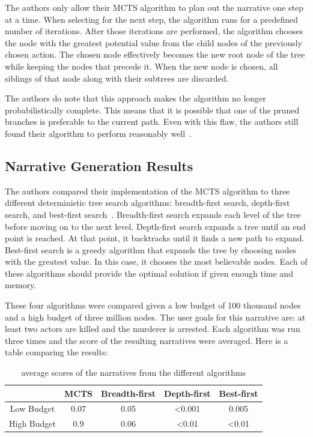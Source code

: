 \documentclass{sig-alternate}
\begin{document}
The authors only allow their MCTS algorithm to plan out the narrative one step at a time. When selecting for the next step, the algorithm runs for a predefined number of iterations. After those iterations are performed, the algorithm chooses the node with the greatest potential value from the child nodes of the previously chosen action. The chosen node effectively becomes the new root node of the tree while keeping the nodes that precede it. When the new node is chosen, all siblings of that node along with their subtrees are discarded.

The authors do note that this approach makes the algorithm no longer probabilistically complete. This means that it is possible that one of the pruned branches is preferable to the current path. Even with this flaw, the authors still found their algorithm to perform reasonably well~\cite{Narrative}.

\subsection{Narrative Generation Results}
The authors compared their implementation of the MCTS algorithm to three different deterministic tree search algorithms: breadth-first search, depth-first search, and best-first search~\cite{Narrative}. Breadth-first search expands each level of the tree before moving on to the next level. Depth-first search expands a tree until an end point is reached. At that point, it backtracks until it finds a new path to expand. Best-first search is a greedy algorithm that expands the tree by choosing nodes with the greatest value. In this case, it chooses the most believable nodes. Each of these algorithms should provide the optimal solution if given enough time and memory.

These four algorithms were compared given a low budget of 100 thousand nodes and a high budget of three million nodes. The user goals for this narrative are: at least two actors are killed and the murderer is arrested. Each algorithm was run three times and the score of the resulting narratives were averaged. Here is a table comparing the results: 

\begin{table}[h]
\centering
	\begin{tabular}{ c | c | c | c | c |}
	\cline{2-5}	 
	 & MCTS & Breadth-first & Depth-first & Best-first \\ \hline
	\multicolumn{1}{|p{1.05cm}|}{Low Budget} & 0.07 & 0.05 & <0.001 & 0.005 \\ \hline
	\multicolumn{1}{|p{1.05cm}|}{High Budget} & 0.9 & 0.06 & <0.01 & <0.01 \\ \hline
	\end{tabular}
	\caption[Table caption text]{average scores of the narratives from the different algorithms}
\end{table}
\end{document}
